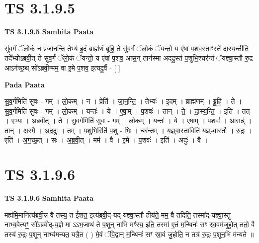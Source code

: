 \documentclass[17pt]{extarticle}
\begin{document}

\section{ TS 3.1.9.5 }

\textbf{TS 3.1.9.5 } \newline
\textbf{Samhita Paata} \newline

सु॑व॒र्गं ॅलो॒कं न प्रजा॑नन्ति॒ तेभ्य॑ इ॒दं ब्राह्म॑णं ब्रूहि॒ ते सु॑व॒र्गं ॅलो॒कं ॅयन्तो॒ य ए॑षां प॒शव॒स्ताꣳस्ते॑ दास्य॒न्तीति॒ तदे᳚भ्योऽब्रवी॒त् ते सु॑व॒र्गं ॅलो॒कं ॅयन्तो॒ य ए॑षां प॒शव॒ आस॒न् तान॑स्मा अददु॒स्तं प॒शुभि॒श्चर॑न्तं ॅयज्ञ्वा॒स्तौ रु॒द्र आऽग॑च्छ॒थ् सो᳚ऽब्रवी॒न्मम॒ वा इ॒मे प॒शव॒ इत्यदु॒र्वै - [  ] \newline

\textbf{Pada Paata} \newline

सु॒व॒र्गमिति॑ सुवः - गम् । लो॒कम् । न । प्रेति॑ । जा॒न॒न्ति॒ । तेभ्यः॑ । इ॒दम् । ब्राह्म॑णम् । ब्रू॒हि॒ । ते । सु॒व॒र्गमिति॑ सुवः - गम् । लो॒कम् । यन्तः॑ । ये । ए॒षा॒म् । प॒शवः॑ । तान् । ते॒ । दा॒स्य॒न्ति॒ । इति॑ । तत् । ए॒भ्यः॒ । अ॒ब्र॒वी॒त् । ते । सु॒व॒र्गमिति॑ सुवः - गम् । लो॒कम् । यन्तः॑ । ये । ए॒षा॒म् । प॒शवः॑ । आसन्न्॑ । तान् । अ॒स्मै॒ । अ॒द॒दुः॒ । तम् । प॒शुभि॒रिति॑ प॒शु - भिः॒ । चर॑न्तम् । य॒ज्ञ्॒वा॒स्ताविति॑ यज्ञ्-वा॒स्तौ । रु॒द्रः । एति॑ । अ॒ग॒च्छ॒त् । सः । अ॒ब्र॒वी॒त् । मम॑ । वै । इ॒मे । प॒शवः॑ । इति॑ । अदुः॑ । वै ।  \newline





\section{ TS 3.1.9.6 }

\textbf{TS 3.1.9.6 } \newline
\textbf{Samhita Paata} \newline

मह्य॑मि॒मानित्य॑ब्रवी॒न्न वै तस्य॒ त ई॑शत॒ इत्य॑ब्रवी॒द्-यद्-य॑ज्ञ्वा॒स्तौ हीय॑ते॒ मम॒ वै तदिति॒ तस्मा᳚द्-यज्ञ्वा॒स्तु नाभ्य॒वेत्यꣳ॒॒ सो᳚ऽब्रवीद्-य॒ज्ञे मा ऽऽभ॒जाथ॑ ते प॒शून् नाभि मꣳ॑स्य॒ इति॒ तस्मा॑ ए॒तं म॒न्थिनः॑ सꣳ स्रा॒वम॑जुहो॒त् ततो॒ वै तस्य॑ रु॒द्रः प॒शून् नाभ्य॑मन्यत॒ यत्रै॒त ( ) मे॒वं ॅवि॒द्वान् म॒न्थिनः॑ सꣳ स्रा॒वं जु॒होति॒ न तत्र॑ रु॒द्रः प॒शून॒भि म॑न्यते ॥ \newline
\end{document}
